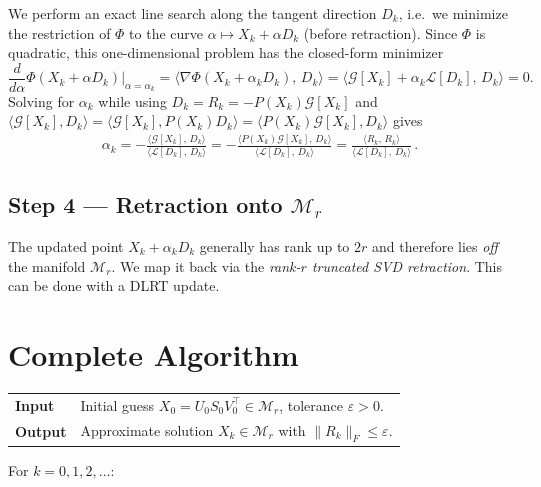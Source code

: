 \documentclass[12pt,a4paper]{article}
\newcommand{\cL}{\mathcal{L}}
\newcommand{\cG}{\mathcal{G}}
\newcommand{\cM}{\mathcal{M}}
\newcommand{\inner}[2]{\langle #1,\, #2 \rangle}
\begin{document}
We perform an exact line search along the tangent direction $D_k$, i.e.\ we
minimize the restriction of $\Phi$ to the curve $\alpha \mapsto X_k + \alpha D_k$
(before retraction).  Since $\Phi$ is quadratic, this one-dimensional
problem has the closed-form minimizer
\begin{equation}\label{eq:stepsize-derivation}
    \frac{d}{d\alpha}\Phi(X_k + \alpha D_k)\Big|_{\alpha=\alpha_k}
    = \inner{\nabla\Phi(X_k + \alpha_k D_k)}{D_k}
    = \inner{\cG[X_k] + \alpha_k \cL[D_k]}{D_k}
    = 0.
\end{equation}
Solving for $\alpha_k$ while using $D_k = R_k = -P(X_k)\cG[X_k]$ and $\langle \cG[X_k], D_k \rangle = \langle \cG[X_k], P(X_k)D_k \rangle=\langle P(X_k)\cG[X_k], D_k \rangle$ gives
\begin{align}
    \alpha_k = -\frac{\inner{\cG[X_k]}{D_k}}{\inner{\cL[D_k]}{D_k}} = -\frac{\inner{P(X_k)\cG[X_k]}{D_k}}{\inner{\cL[D_k]}{D_k}} = \frac{\inner{R_k}{R_k}}{\inner{\cL[D_k]}{D_k}}\,.
\end{align}

\subsection{Step 4 — Retraction onto $\cM_r$}

The updated point $X_k + \alpha_k D_k$ generally has rank up to $2r$ and
therefore lies \emph{off} the manifold $\cM_r$.  We map it back via the
\emph{rank-$r$ truncated SVD retraction}. This can be done with a DLRT update.


\section{Complete Algorithm}

\begin{center}
\renewcommand{\arraystretch}{1.5}
\begin{tabular}{ll}
\toprule
\textbf{Input}  & Initial guess $X_0 = U_0 S_0 V_0^\top \in \cM_r$,
                  tolerance $\varepsilon > 0$. \\
\textbf{Output} & Approximate solution $X_k \in \cM_r$ with
                  $\|R_k\|_F \le \varepsilon$. \\
\bottomrule
\end{tabular}
\end{center}

\medskip
\noindent For $k = 0, 1, 2, \ldots$:
\end{document}
